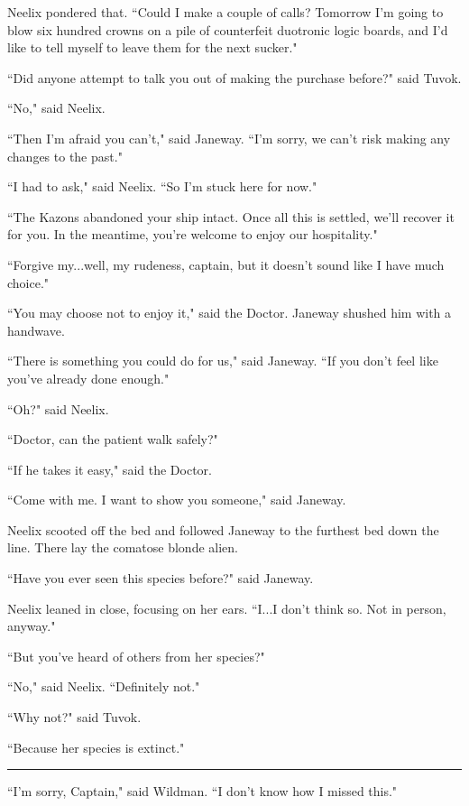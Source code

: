 \documentclass[twoside,letterpaper,12pt]{memoir}
\begin{document}
Neelix pondered that. ``Could I make a couple of calls? Tomorrow I'm going to blow six hundred crowns on a pile of counterfeit duotronic logic boards, and I'd like to tell myself to leave them for the next sucker." 

``Did anyone attempt to talk you out of making the purchase before?" said Tuvok. 

``No," said Neelix. 

``Then I'm afraid you can't," said Janeway. ``I'm sorry, we can't risk making any changes to the past." 

``I had to ask," said Neelix. ``So I'm stuck here for now." 

``The Kazons abandoned your ship intact. Once all this is settled, we'll recover it for you. In the meantime, you're welcome to enjoy our hospitality." 

``Forgive my...well, my rudeness, captain, but it doesn't sound like I have much choice." 

``You may choose not to enjoy it," said the Doctor. Janeway shushed him with a handwave. 

``There is something you could do for us," said Janeway. ``If you don't feel like you've already done enough." 

``Oh?" said Neelix. 

``Doctor, can the patient walk safely?" 

``If he takes it easy," said the Doctor. 

``Come with me. I want to show you someone," said Janeway. 

Neelix scooted off the bed and followed Janeway to the furthest bed down the line. There lay the comatose blonde alien. 

``Have you ever seen this species before?" said Janeway. 

Neelix leaned in close, focusing on her ears. ``I...I don't think so. Not in person, anyway." 

``But you've heard of others from her species?" 

``No," said Neelix. ``Definitely not." 

``Why not?" said Tuvok. 

``Because her species is extinct." 

\begin{center}\rule{3cm}{0.4 pt}\end{center} 

``I'm sorry, Captain," said Wildman. ``I don't know how I missed this." 
\end{document}
